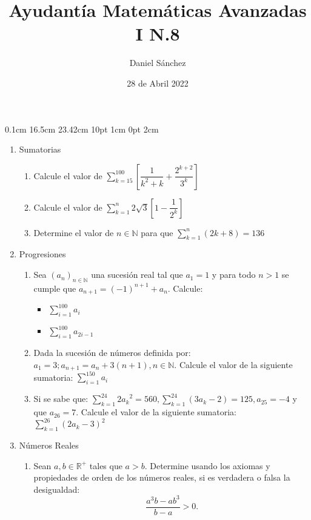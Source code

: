 \documentclass[12pt]{article}
\newcommand{\D}{\displaystyle}
\begin{document}
\setmargins{2.5cm}
{0.1cm}
{16.5cm}
{23.42cm}
{10pt}
{1cm}
{0pt}
{2cm}

\title{Ayudant\'ia Matem\'aticas Avanzadas I N.8}
\date{28 de Abril 2022}
\author{Daniel S\'anchez}
\maketitle

\begin{enumerate}
      \item Sumatorias
            \begin{enumerate}
                  \item Calcule el valor de $\D \sum_{k=15}^{100}\left[\dfrac{1}{k^2+k}+\dfrac{2^{k+2}}{3^k}\right]$
                  \item Calcule el valor de $\D \sum_{k=1}^{n}2\sqrt{3}\left[1-\dfrac{1}{2^k}\right]$
                  \item Determine el valor de $n\in \mathbb{N}$ para que $\D \sum_{k=1}^{n} (2k+8)=136$
            \end{enumerate}
      \item Progresiones
            \begin{enumerate}
                  \item Sea $(a_n)_{n\in\mathbb{N}}$ una sucesión real tal que $a_1 = 1$ y para todo $n>1$ se cumple que $a_{n+1} = (-1)^{n+1} + a_n$. Calcule:
                        \begin{itemize}
                              \item $\D \sum_{i=1}^{100}a_i$
                              \item $\D \sum_{i=1}^{100}a_{2i-1}$
                        \end{itemize}
                  \item Dada la sucesión de números definida por: $a_1 = 3; a_{n+1}=a_n+3(n+1), n \in\mathbb{N}$. Calcule el valor de la siguiente sumatoria: $\D \sum_{i=1}^{150}a_i$
                  \item Si se sabe que: $\D \sum_{k=1}^{24}{2a_k}^2=560, \D \sum_{k=1}^{24}(3a_k-2)= 125, a_{25} = -4$ y que $a_{26} = 7$. Calcule el valor de la siguiente sumatoria: $\D \sum_{k=1}^{26}(2a_k-3)^2$
            \end{enumerate}
            \pagebreak
      \item Números Reales
            \begin{enumerate}
                  \item Sean $a,b \in\mathbb{R}^{+}$ tales que $a>b$. Determine usando los axiomas y propiedades de orden de los números reales, si es verdadera o falsa la desigualdad: $$\frac{a^{3}b-ab^{3}}{b-a}>0.$$

\end{enumerate}
\end{enumerate}
\end{document}
